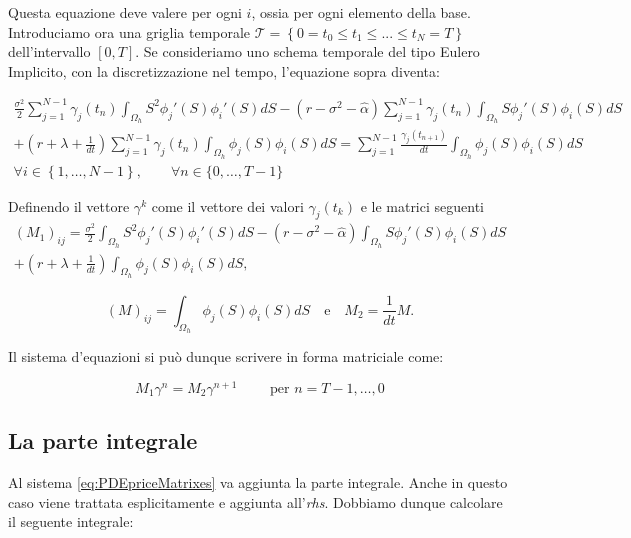 \documentclass[a4paper,10pt]{report}
\theoremstyle{plain}
\theoremstyle{definition}
\theoremstyle{remark}
\begin{document}
Questa equazione deve valere per ogni $i$, ossia per ogni elemento della base.
Introduciamo ora una griglia temporale $\mathcal{T}=\left\{0= t_0\leq t_1\leq ... \leq t_N=T\right\}$ dell'intervallo $[0,T]$. Se consideriamo uno schema temporale del tipo Eulero Implicito, con la discretizzazione nel tempo, l'equazione sopra diventa:

\begin{multline}
\label{eq:discretizedPDEprice}\frac{\sigma^2}{2}\sum_{j=1}^{N-1} \gamma_j(t_n)\int_{\Omega_h} S^2\phi_j'(S)\phi_i'(S)dS
-(r-\sigma^2-\hat{\alpha})\sum_{j=1}^{N-1}\gamma_j(t_n)\int_{\Omega_h}S\phi_j'(S)\phi_i(S)dS\\
+\left(r+\lambda+\frac{1}{dt}\right)\sum_{j=1}^{N-1}\gamma_j(t_n)\int_{\Omega_h}\phi_j(S)\phi_i(S)dS=\sum_{j=1}^{N-1}\frac{\gamma_j(t_{n+1})}{dt}\int_{\Omega_h}\phi_j(S)\phi_i(S)dS \\ \forall i \in \left\lbrace 1,\dots,N-1 \right\rbrace, \qquad \forall n \in \lbrace0,\dots,T-1\rbrace
\end{multline}

Definendo il vettore  ${\gamma}^k$ come il vettore dei valori $\gamma_j(t_k)$ e le matrici seguenti
\begin{multline*}
 (M_1)_{ij}=\frac{\sigma^2}{2}\int_{\Omega_h}S^2\phi_j'(S)\phi_i'(S)dS-(r-\sigma^2-\hat{\alpha})\int_{\Omega_h}S\phi_j'(S)\phi_i(S)dS\\
 +\left(r+\lambda+\frac{1}{dt}\right)\int_{\Omega_h}\phi_j(S)\phi_i(S)dS,
\end{multline*}

\begin{equation*}
(M)_{ij}=\int_{\Omega_h}\phi_j(S)\phi_i(S)dS \quad\text{e}\quad M_2=\frac{1}{dt}M.
\end{equation*}

Il sistema d'equazioni si può dunque scrivere in forma matriciale come:

\begin{equation}
 \label{eq:PDEpriceMatrixes}
 M_1 \gamma^n=M_2\gamma^{n+1} \qquad \text{ per } n=T-1,\dots,0
\end{equation}

\subsection{La parte integrale}
Al sistema \eqref{eq:PDEpriceMatrixes} va aggiunta la parte integrale. Anche in questo caso viene trattata esplicitamente e aggiunta all'\emph{rhs}. Dobbiamo dunque calcolare il seguente integrale:
\end{document}
